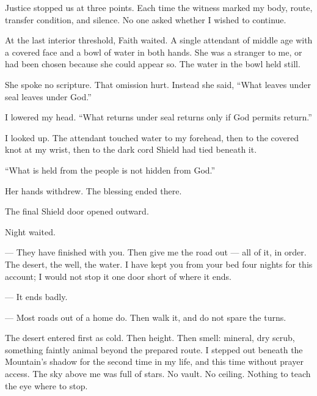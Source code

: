Justice stopped us at three points. Each time the witness marked my body, route, transfer condition, and silence. No one asked whether I wished to continue.\par

At the last interior threshold, Faith waited. A single attendant of middle age with a covered face and a bowl of water in both hands. She was a stranger to me, or had been chosen because she could appear so. The water in the bowl held still.\par

She spoke no scripture. That omission hurt. Instead she said, ``What leaves under seal leaves under God.''\par

I lowered my head. ``What returns under seal returns only if God permits return.''\par

I looked up. The attendant touched water to my forehead, then to the covered knot at my wrist, then to the dark cord Shield had tied beneath it.\par

``What is held from the people is not hidden from God.''\par

Her hands withdrew. The blessing ended there.\par

The final Shield door opened outward.\par

Night waited.\par

\ornament

\begin{room}

--- They have finished with you. Then give me the road out --- all of it, in order. The desert, the well, the water. I have kept you from your bed four nights for this account; I would not stop it one door short of where it ends.

--- It ends badly.

--- Most roads out of a home do. Then walk it, and do not spare the turns.

\end{room}

\ornament

The desert entered first as cold. Then height. Then smell: mineral, dry scrub, something faintly animal beyond the prepared route. I stepped out beneath the Mountain's shadow for the second time in my life, and this time without prayer access. The sky above me was full of stars. No vault. No ceiling. Nothing to teach the eye where to stop.\par

